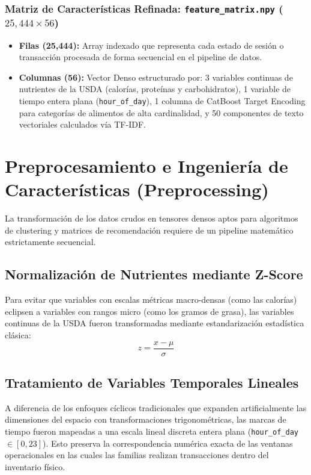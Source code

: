 \documentclass[11pt,a4paper]{article}
\begin{document}
\subsubsection{Matriz de Características Refinada: \texttt{feature\_matrix.npy} ($25,444 \times 56$)}
\begin{itemize}
    \item \textbf{Filas (25,444):} Array indexado que representa cada estado de sesión o transacción procesada de forma secuencial en el pipeline de datos.
    \item \textbf{Columnas (56):} Vector Denso estructurado por: 3 variables continuas de nutrientes de la USDA (calorías, proteínas y carbohidratos), 1 variable de tiempo entera plana (\texttt{hour\_of\_day}), 1 columna de CatBoost Target Encoding para categorías de alimentos de alta cardinalidad, y 50 componentes de texto vectoriales calculados vía TF-IDF.
\end{itemize}

\section{Preprocesamiento e Ingeniería de Características (Preprocessing)}
La transformación de los datos crudos en tensores densos aptos para algoritmos de clustering y matrices de recomendación requiere de un pipeline matemático estrictamente secuencial.

\subsection{Normalización de Nutrientes mediante Z-Score}
Para evitar que variables con escalas métricas macro-densas (como las calorías) eclipsen a variables con rangos micro (como los gramos de grasa), las variables continuas de la USDA fueron transformadas mediante estandarización estadística clásica:
\begin{equation}
z = \frac{x - \mu}{\sigma}
\end{equation}

\subsection{Tratamiento de Variables Temporales Lineales}
A diferencia de los enfoques cíclicos tradicionales que expanden artificialmente las dimensiones del espacio con transformaciones trigonométricas, las marcas de tiempo fueron mapeadas a una escala lineal discreta entera plana (\texttt{hour\_of\_day} $\in [0, 23]$). Esto preserva la correspondencia numérica exacta de las ventanas operacionales en las cuales las familias realizan transacciones dentro del inventario físico.
\end{document}
